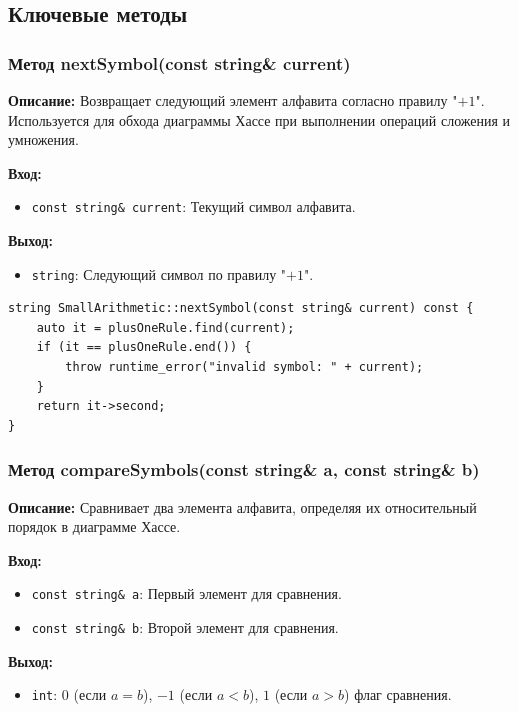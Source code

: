 \subsection*{Ключевые методы}

\subsubsection{Метод nextSymbol(const string\& current)}

\textbf{Описание:} Возвращает следующий элемент алфавита согласно правилу "$+1$".  Используется для обхода диаграммы Хассе при выполнении операций сложения и умножения. 

\textbf{Вход:}
\begin{itemize}
    \item \texttt{const string\& current}:  Текущий символ алфавита.
\end{itemize}

\textbf{Выход:}
\begin{itemize}
    \item \texttt{string}:  Следующий символ по правилу "$+1$". 
\end{itemize}

\begin{lstlisting}[style=cstyle, caption={Реализация nextSymbol()}]
string SmallArithmetic::nextSymbol(const string& current) const {
    auto it = plusOneRule.find(current);
    if (it == plusOneRule.end()) {
        throw runtime_error("invalid symbol: " + current);
    }
    return it->second;
}
\end{lstlisting}

\subsubsection{Метод compareSymbols(const string\& a, const string\& b)}

\textbf{Описание:} Сравнивает два элемента алфавита, определяя их относительный порядок в диаграмме Хассе.

\textbf{Вход:}
\begin{itemize}
    \item \texttt{const string\& a}: Первый элемент для сравнения. 
    \item \texttt{const string\& b}: Второй элемент для сравнения.
\end{itemize}

\textbf{Выход:}
\begin{itemize}
    \item \texttt{int}: $0$ (если $a = b$), $-1$ (если $a < b$), $1$ (если $a > b$) флаг сравнения.
\end{itemize}

